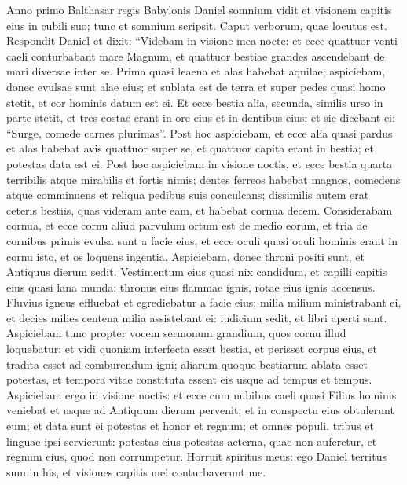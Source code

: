 \begin{biblechapter}  
\verse Anno primo Balthasar regis Babylonis Daniel somnium vidit et visionem capitis eius in cubili suo; tunc et somnium scripsit. Caput verborum, quae locutus est. 
\verse Respondit Daniel et dixit: “Videbam in visione mea nocte: et ecce quattuor venti caeli conturbabant mare Magnum, 
\verse et quattuor bestiae grandes ascendebant de mari diversae inter se. 
\verse Prima quasi leaena et alas habebat aquilae; aspiciebam, donec evulsae sunt alae eius; et sublata est de terra et super pedes quasi homo stetit, et cor hominis datum est ei. 
\verse Et ecce bestia alia, secunda, similis urso in parte stetit, et tres costae erant in ore eius et in dentibus eius; et sic dicebant ei: “Surge, comede carnes plurimas”. 
\verse Post hoc aspiciebam, et ecce alia quasi pardus et alas habebat avis quattuor super se, et quattuor capita erant in bestia; et potestas data est ei.  
\verse Post hoc aspiciebam in visione noctis, et ecce bestia quarta terribilis atque mirabilis et fortis nimis; dentes ferreos habebat magnos, comedens atque comminuens et reliqua pedibus suis conculcans; dissimilis autem erat ceteris bestiis, quas videram ante eam, et habebat cornua decem. 
\verse Considerabam cornua, et ecce cornu aliud parvulum ortum est de medio eorum, et tria de cornibus primis evulsa sunt a facie eius; et ecce oculi quasi oculi hominis erant in cornu isto, et os loquens ingentia. 
\verse Aspiciebam, donec throni positi sunt, et Antiquus dierum sedit. Vestimentum eius quasi nix candidum, et capilli capitis eius quasi lana munda; thronus eius flammae ignis, rotae eius ignis accensus. 
\verse Fluvius igneus effluebat et egrediebatur a facie eius; milia milium ministrabant ei, et decies milies centena milia assistebant ei: iudicium sedit, et libri aperti sunt. 
\verse Aspiciebam tunc propter vocem sermonum grandium, quos cornu illud loquebatur; et vidi quoniam interfecta esset bestia, et perisset corpus eius, et tradita esset ad comburendum igni; 
\verse aliarum quoque bestiarum ablata esset potestas, et tempora vitae constituta essent eis usque ad tempus et tempus. 
\verse Aspiciebam ergo in visione noctis: et ecce cum nubibus caeli quasi Filius hominis veniebat et usque ad Antiquum dierum pervenit, et in conspectu eius obtulerunt eum; 
\verse et data sunt ei potestas et honor et regnum; et omnes populi, tribus et linguae ipsi servierunt: potestas eius potestas aeterna, quae non auferetur, et regnum eius, quod non corrumpetur. 
\verse Horruit spiritus meus: ego Daniel territus sum in his, et visiones capitis mei conturbaverunt me. 

\end{biblechapter}
